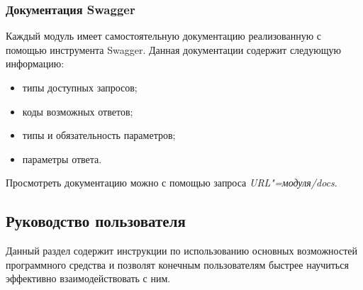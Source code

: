 \subsubsection{Документация Swagger}
Каждый модуль имеет самостоятельную документацию реализованную с помощью инструмента Swagger.
Данная документации содержит следующую информацию:
\begin{itemize}
    \item типы доступных запросов;
    \item коды возможных ответов;
    \item типы и обязательность параметров;
    \item параметры ответа.
\end{itemize}

Просмотреть документацию можно с помощью запроса \mbox{\emph{URL"=модуля/docs}}.

\subsection{Руководство пользователя}
\label{sec:manpage:client_man}
Данный раздел содержит инструкции по использованию основных возможностей программного средства и позволят конечным пользователям быстрее научиться эффективно взаимодействовать с ним.

